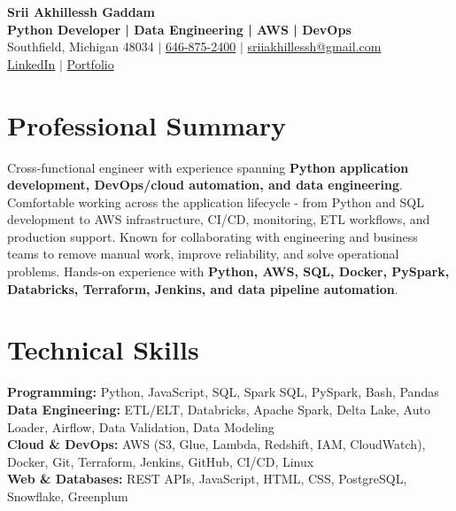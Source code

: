 \documentclass[letterpaper,10pt]{article}
\begin{document}
\fontsize{9.35pt}{10.45pt}\selectfont

\begin{center}
    {\LARGE \textbf{Srii Akhillessh Gaddam}} \\[-1pt]
    \textbf{Python Developer | Data Engineering | AWS | DevOps} \\[2pt]
    Southfield, Michigan 48034 $|$
    \href{tel:6468752400}{646-875-2400} $|$
    \href{mailto:sriiakhillessh@gmail.com}{sriiakhillessh@gmail.com} \\[1pt]
    \href{https://www.linkedin.com/in/srii-akhiilessh-gaddam-b48668191/}{LinkedIn} $|$
    \href{https://sriiakhillesshg.github.io/portfolio/}{Portfolio}
\end{center}
\vspace{-8pt}

\section{Professional Summary}
\small{Cross-functional engineer with experience spanning \textbf{Python application development, DevOps/cloud automation, and data engineering}. Comfortable working across the application lifecycle - from Python and SQL development to AWS infrastructure, CI/CD, monitoring, ETL workflows, and production support. Known for collaborating with engineering and business teams to remove manual work, improve reliability, and solve operational problems. Hands-on experience with \textbf{Python, AWS, SQL, Docker, PySpark, Databricks, Terraform, Jenkins, and data pipeline automation}.}

\section{Technical Skills}
\small{
\textbf{Programming:} Python, JavaScript, SQL, Spark SQL, PySpark, Bash, Pandas \\
\textbf{Data Engineering:} ETL/ELT, Databricks, Apache Spark, Delta Lake, Auto Loader, Airflow, Data Validation, Data Modeling \\
\textbf{Cloud \& DevOps:} AWS (S3, Glue, Lambda, Redshift, IAM, CloudWatch), Docker, Git, Terraform, Jenkins, GitHub, CI/CD, Linux \\
\textbf{Web \& Databases:} REST APIs, JavaScript, HTML, CSS, PostgreSQL, Snowflake, Greenplum
}
\end{document}

